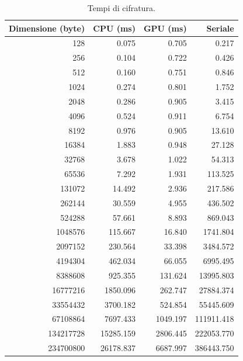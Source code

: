 \documentclass[12pt,a4paper,oneside]{book}
\begin{document}
\begin{table}[p]
\begin{center}
\begin{tabular}{|r|r|r|r|}
\hline
\textbf{Dimensione (byte)} & \textbf{CPU (ms)} & \textbf{GPU (ms)} & \textbf{Seriale} \\
\hline
128 & 0.075 & 0.705 & 0.217 \\
\hline
256 & 0.104 & 0.722 & 0.426 \\
\hline
512 & 0.160 & 0.751 & 0.846 \\
\hline
1024 & 0.274 & 0.801 & 1.752 \\
\hline
2048 & 0.286 & 0.905 & 3.415 \\
\hline
4096 & 0.524 & 0.911 & 6.754 \\
\hline
8192 & 0.976 & 0.905 & 13.610 \\
\hline
16384 & 1.883 & 0.948 & 27.128 \\
\hline
32768 & 3.678 & 1.022 & 54.313 \\
\hline
65536 & 7.292 & 1.931 & 113.525 \\
\hline
131072 & 14.492 & 2.936 & 217.586 \\
\hline
262144 & 30.559 & 4.955 & 436.502 \\
\hline
524288 & 57.661 & 8.893 & 869.043 \\
\hline
1048576 & 115.667 & 16.840 & 1741.804 \\
\hline
2097152 & 230.564 & 33.398 & 3484.572 \\
\hline
4194304 & 462.034 & 66.055 & 6995.495 \\
\hline
8388608 & 925.355 & 131.624 & 13995.803 \\
\hline
16777216 & 1850.096 & 262.747 & 27884.374 \\
\hline
33554432 & 3700.182 & 524.854 & 55445.609 \\
\hline
67108864 & 7697.433 & 1049.197 & 111911.418 \\
\hline
134217728 & 15285.159 & 2806.445 & 222053.770 \\
\hline
234700800 & 26178.837 & 6687.997 & 386443.750 \\
\hline
\end{tabular}
\caption{Tempi di cifratura.\label{tab:test-encrypt}}
\end{center}
\end{table}
\end{document}
